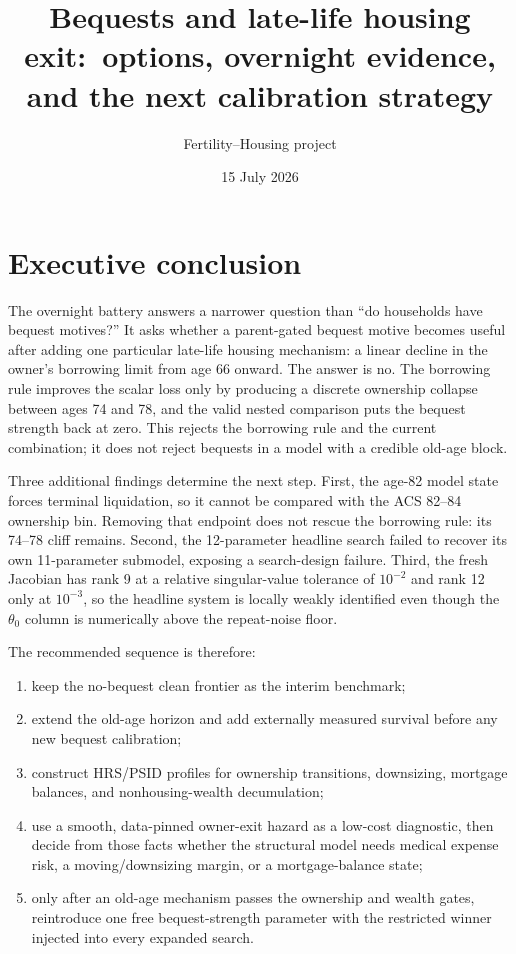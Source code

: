 \documentclass[10pt]{article}
\title{Bequests and late-life housing exit:\
options, overnight evidence, and the next calibration strategy}
\author{Fertility--Housing project}
\date{15 July 2026}
\begin{document}
\maketitle

\section*{Executive conclusion}

The overnight battery answers a narrower question than ``do households have
bequest motives?'' It asks whether a parent-gated bequest motive becomes useful
after adding one particular late-life housing mechanism: a linear decline in
the owner's borrowing limit from age 66 onward. The answer is no. The
borrowing rule improves the scalar loss only by producing a discrete ownership
collapse between ages 74 and 78, and the valid nested comparison puts the
bequest strength back at zero. This rejects the borrowing rule and the current
combination; it does not reject bequests in a model with a credible old-age
block.

Three additional findings determine the next step. First, the age-82 model
state forces terminal liquidation, so it cannot be compared with the ACS
82--84 ownership bin. Removing that endpoint does not rescue the borrowing
rule: its 74--78 cliff remains. Second, the 12-parameter headline search failed
to recover its own 11-parameter submodel, exposing a search-design failure.
Third, the fresh Jacobian has rank 9 at a relative singular-value tolerance of
$10^{-2}$ and rank 12 only at $10^{-3}$, so the headline system is locally
weakly identified even though the $\theta_0$ column is numerically above the
repeat-noise floor.

The recommended sequence is therefore:
\begin{enumerate}
  \item keep the no-bequest clean frontier as the interim benchmark;
  \item extend the old-age horizon and add externally measured survival before
  any new bequest calibration;
  \item construct HRS/PSID profiles for ownership transitions, downsizing,
  mortgage balances, and nonhousing-wealth decumulation;
  \item use a smooth, data-pinned owner-exit hazard as a low-cost diagnostic,
  then decide from those facts whether the structural model needs medical
  expense risk, a moving/downsizing margin, or a mortgage-balance state;
  \item only after an old-age mechanism passes the ownership and wealth gates,
  reintroduce one free bequest-strength parameter with the restricted winner
  injected into every expanded search.
\end{enumerate}
\end{document}
